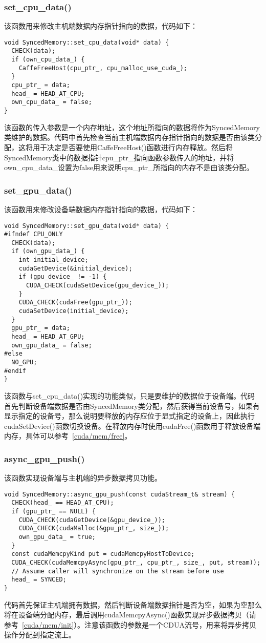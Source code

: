 \subsubsection{set\_cpu\_data()}
该函数用来修改主机端数据内存指针指向的数据，代码如下：
\begin{verbatim}
void SyncedMemory::set_cpu_data(void* data) {
  CHECK(data);
  if (own_cpu_data_) {
    CaffeFreeHost(cpu_ptr_, cpu_malloc_use_cuda_);
  }
  cpu_ptr_ = data;
  head_ = HEAD_AT_CPU;
  own_cpu_data_ = false;
}
\end{verbatim}
该函数的传入参数是一个内存地址，这个地址所指向的数据将作为SyncedMemory类维护的数据。代码中首先检查当前主机端数据内存指针指向的数据是否由该类分配，这将用于决定是否要使用CaffeFreeHost()函数进行内存释放。然后将SyncedMemory类中的数据指针cpu\_ptr\_指向函数参数传入的地址，并将own\_cpu\_data\_设置为false用来说明cpu\_ptr\_所指向的内存不是由该类分配。
\subsubsection{set\_gpu\_data()}
该函数用来修改设备端数据内存指针指向的数据，代码如下：
\begin{verbatim}
void SyncedMemory::set_gpu_data(void* data) {
#ifndef CPU_ONLY
  CHECK(data);
  if (own_gpu_data_) {
    int initial_device;
    cudaGetDevice(&initial_device);
    if (gpu_device_ != -1) {
      CUDA_CHECK(cudaSetDevice(gpu_device_));
    }
    CUDA_CHECK(cudaFree(gpu_ptr_));
    cudaSetDevice(initial_device);
  }
  gpu_ptr_ = data;
  head_ = HEAD_AT_GPU;
  own_gpu_data_ = false;
#else
  NO_GPU;
#endif
}
\end{verbatim}
该函数与set\_cpu\_data()实现的功能类似，只是要维护的数据位于设备端。代码首先判断设备端数据是否由SyncedMemory类分配，然后获得当前设备号，如果有显示指定的设备号，那么说明要释放的内存应位于显式指定的设备上，因此执行cudaSetDevice()函数切换设备。在释放内存时使用cudaFree()函数用于释放设备端内存，具体可以参考~\ref{cuda/mem/free}。
\subsubsection{async\_gpu\_push()}
该函数实现设备端与主机端的异步数据拷贝功能。
\begin{verbatim}
void SyncedMemory::async_gpu_push(const cudaStream_t& stream) {
  CHECK(head_ == HEAD_AT_CPU);
  if (gpu_ptr_ == NULL) {
    CUDA_CHECK(cudaGetDevice(&gpu_device_));
    CUDA_CHECK(cudaMalloc(&gpu_ptr_, size_));
    own_gpu_data_ = true;
  }
  const cudaMemcpyKind put = cudaMemcpyHostToDevice;
  CUDA_CHECK(cudaMemcpyAsync(gpu_ptr_, cpu_ptr_, size_, put, stream));
  // Assume caller will synchronize on the stream before use
  head_ = SYNCED;
}
\end{verbatim}
代码首先保证主机端拥有数据，然后判断设备端数据指针是否为空，如果为空那么将在设备端分配内存，最后调用cudaMemcpyAsync()函数实现异步数据拷贝（请参考~\ref{cuda/mem/init}）。注意该函数的参数是一个CDUA流号，用来将异步拷贝操作分配到指定流上。
